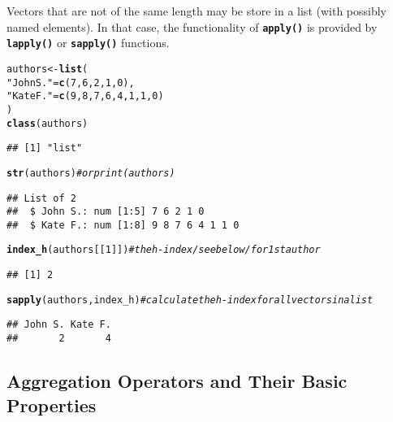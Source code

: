 \documentclass[11pt]{article}\usepackage[]{graphicx}\usepackage[]{color}
\makeatletter
\newcommand{\hlnum}[1]{\textcolor[rgb]{0.686,0.059,0.569}{#1}}%
\newcommand{\hlstr}[1]{\textcolor[rgb]{0.192,0.494,0.8}{#1}}%
\newcommand{\hlcom}[1]{\textcolor[rgb]{0.678,0.584,0.686}{\textit{#1}}}%
\newcommand{\hlstd}[1]{\textcolor[rgb]{0.345,0.345,0.345}{#1}}%
\newcommand{\hlkwb}[1]{\textcolor[rgb]{0.69,0.353,0.396}{#1}}%
\newcommand{\hlkwd}[1]{\textcolor[rgb]{0.737,0.353,0.396}{\textbf{#1}}}%
\newenvironment{kframe}{%
 \def\at@end@of@kframe{}%
 \ifinner\ifhmode%
  \def\at@end@of@kframe{\end{minipage}}%
  \begin{minipage}{\columnwidth}%
 \fi\fi%
 \def\FrameCommand##1{\hskip\@totalleftmargin \hskip-\fboxsep
 \colorbox{shadecolor}{##1}\hskip-\fboxsep
     \hskip-\linewidth \hskip-\@totalleftmargin \hskip\columnwidth}%
 \MakeFramed {\advance\hsize-\width
   \@totalleftmargin\z@ \linewidth\hsize
   \@setminipage}}%
 {\par\unskip\endMakeFramed%
 \at@end@of@kframe}
\newenvironment{knitrout}{}{} %
\newcommand{\Rfunc}[1]{\texttt{\hlkwd{#1}}}
\theoremstyle{remark}
\theoremstyle{definition}
\makeatother
\begin{document}
Vectors that are not of the same length may be store in a list (with
possibly named elements). In that case, the functionality
of \Rfunc{apply()} is provided by \Rfunc{lapply()} or
\Rfunc{sapply()} functions.

\begin{knitrout}\small
{}\color{fgcolor}\begin{kframe}
\begin{alltt}
\hlstd{authors} \hlkwb{<-} \hlkwd{list}\hlstd{(}
   \hlstr{"John S."} \hlstd{=} \hlkwd{c}\hlstd{(}\hlnum{7}\hlstd{,}\hlnum{6}\hlstd{,}\hlnum{2}\hlstd{,}\hlnum{1}\hlstd{,}\hlnum{0}\hlstd{),}
   \hlstr{"Kate F."} \hlstd{=} \hlkwd{c}\hlstd{(}\hlnum{9}\hlstd{,}\hlnum{8}\hlstd{,}\hlnum{7}\hlstd{,}\hlnum{6}\hlstd{,}\hlnum{4}\hlstd{,}\hlnum{1}\hlstd{,}\hlnum{1}\hlstd{,}\hlnum{0}\hlstd{)}
\hlstd{)}
\hlkwd{class}\hlstd{(authors)}
\end{alltt}
\begin{verbatim}
## [1] "list"
\end{verbatim}
\begin{alltt}
\hlkwd{str}\hlstd{(authors)}   \hlcom{# or print(authors)}
\end{alltt}
\begin{verbatim}
## List of 2
##  $ John S.: num [1:5] 7 6 2 1 0
##  $ Kate F.: num [1:8] 9 8 7 6 4 1 1 0
\end{verbatim}
\begin{alltt}
\hlkwd{index_h}\hlstd{(authors[[}\hlnum{1}\hlstd{]])} \hlcom{# the h-index /see below/ for 1st author}
\end{alltt}
\begin{verbatim}
## [1] 2
\end{verbatim}
\begin{alltt}
\hlkwd{sapply}\hlstd{(authors, index_h)} \hlcom{# calculate the h-index for all vectors in a list}
\end{alltt}
\begin{verbatim}
## John S. Kate F. 
##       2       4
\end{verbatim}
\end{kframe}
\end{knitrout}





\subsection{Aggregation Operators and Their Basic Properties}
\end{document}
